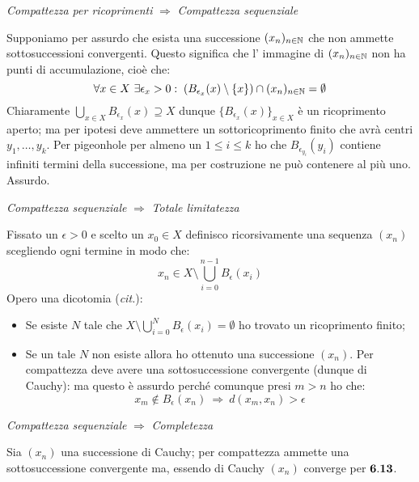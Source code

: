 \centerline{ {\it Compattezza per ricoprimenti} $\Rightarrow$ {\it Compattezza sequenziale}}
Supponiamo per assurdo che esista una successione $(x_n)_{n\in\mathbb{N}}$ che non ammette sottosuccessioni convergenti. Questo significa che l' immagine di $(x_n)_{n\in\mathbb{N}}$ non ha punti di accumulazione, cioè che:
$$ \forall x\in X\  \exists \epsilon_x > 0: \; \left( B_{\epsilon_x}(x)\setminus \{x\}\right) \cap (x_n)_{n\in\mathbb{N}} = \emptyset $$
Chiaramente $\bigcup_{x\in X}B_{\epsilon_x}(x)\supseteq X$ dunque $\{B_{\epsilon_x}(x)\}_{x\in X}$ è un ricoprimento aperto; ma per ipotesi deve ammettere un sottoricoprimento finito che avrà centri $y_1,\ldots,y_k$. Per pigeonhole per almeno un $1\leq i\leq k$ ho che $B_{\epsilon_{y_i}}(y_i)$ contiene infiniti termini della successione, ma per costruzione ne può contenere al più uno. Assurdo.\\

\centerline{{\it Compattezza sequenziale} $\Rightarrow$ {\it Totale limitatezza}}
Fissato un $\epsilon > 0$ e scelto un $x_0 \in X$ definisco ricorsivamente una sequenza $(x_n)$ scegliendo ogni termine in modo che:
$$x_{n} \in X \setminus \bigcup_{i=0}^{n-1}B_\epsilon(x_i)$$
Opero una dicotomia ({\it cit.}):
\begin{itemize}
\item Se esiste $N$ tale che $X \setminus \bigcup_{i=0}^{N}B_\epsilon(x_i) = \emptyset $ ho trovato un ricoprimento finito;
\item Se un tale $N$ non esiste allora ho ottenuto una successione $(x_n)$. Per compattezza deve avere una sottosuccessione convergente (dunque di Cauchy): ma questo è assurdo perché comunque presi $m>n$ ho che:
$$ x_m\notin B_{\epsilon}(x_n)\ \Rightarrow\ d(x_m,x_n)>\epsilon $$
\end{itemize}

\centerline{{\it Compattezza sequenziale} $\Rightarrow$ {\it Completezza}}
Sia $(x_n)$ una successione di Cauchy; per compattezza ammette una sottosuccessione convergente ma, essendo di Cauchy $(x_n)$ converge per ${\bf 6.13}$.\\

